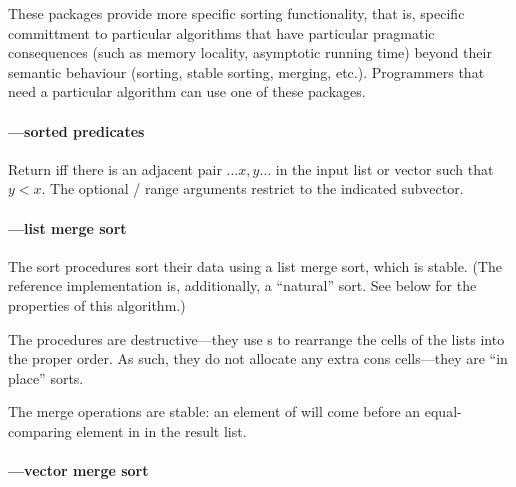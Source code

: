 These packages provide more specific sorting functionality, that is,
specific committment to particular algorithms that have particular
pragmatic consequences (such as memory locality, asymptotic running time)
beyond their semantic behaviour (sorting, stable sorting, merging, etc.).
Programmers that need a particular algorithm can use one of these packages.

\paragraph{---sorted predicates}
%
\begin{protos}
\end{protos}

Return  iff there is an adjacent pair \(\ldots x, y \ldots\) in the input
list or vector such that $y < x$. The optional / range 
arguments restrict  to the indicated subvector.

\paragraph{---list merge sort}
%
\begin{protos}
\end{protos}
%
The sort procedures sort their data using a list merge sort, which is
stable. (The reference implementation is, additionally, a ``natural'' sort.
See below for the properties of this algorithm.)

The \code{!} procedures are destructive---they use s to
rearrange the cells of the lists into the proper order. As such, they
do not allocate any extra cons cells---they are ``in place'' sorts.

The merge operations are stable: an element of  will
come before an equal-comparing element in  in the result
list.

\paragraph{---vector merge sort}

